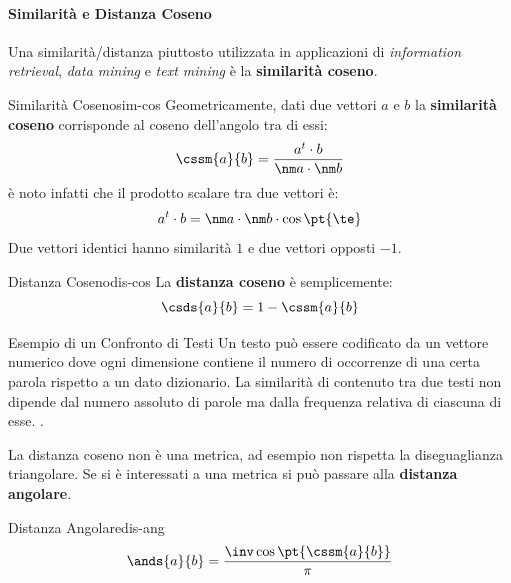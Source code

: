 \paragraph{Similarità e Distanza Coseno}\label{par:similarita_e_distanza_coseno} %
Una similarità/distanza piuttosto utilizzata in applicazioni di \textit{information retrieval}, \textit{data mining} e \textit{text mining} è la \textbf{similarità coseno}.
\begin{definition}{Similarità Coseno}{sim-cos}
    Geometricamente, dati due vettori $a$ e $b$ la \textbf{similarità coseno} corrisponde al coseno dell'angolo tra di essi:
    \[
        \cssm{a}{b} = \dfrac{a^t \cdot b}{\nm a \cdot \nm b}
    \]
    è noto infatti che il prodotto scalare tra due vettori è:
    \[
        a^t \cdot b = \nm a \cdot \nm b \cdot \cos{\pt{\te}}
    \]
    Due vettori identici hanno similarità $1$ e due vettori opposti $-1$.
\end{definition}
\begin{definition}{Distanza Coseno}{dis-cos}
    La \textbf{distanza coseno} è semplicemente:
    \[
        \csds{a}{b} = 1 - \cssm{a}{b}
    \]
\end{definition}
\begin{example}{Esempio di un Confronto di Testi}{}
    Un testo può essere codificato da un vettore numerico dove ogni dimensione contiene il numero di occorrenze di una certa parola rispetto a un dato dizionario.
    La similarità di contenuto tra due testi non dipende dal numero assoluto di parole ma dalla frequenza relativa di ciascuna di esse.
    .
\end{example}
\begin{note}
    La distanza coseno non è una metrica, ad esempio non rispetta la diseguaglianza triangolare.
    Se si è interessati a una metrica si può passare alla \textbf{distanza angolare}.
\end{note}
\begin{definition}{Distanza Angolare}{dis-ang}
    \[
        \ands{a}{b} = \dfrac{\inv\cos{\pt{\cssm{a}{b}}}}{\pi}
    \]
\end{definition}
%
